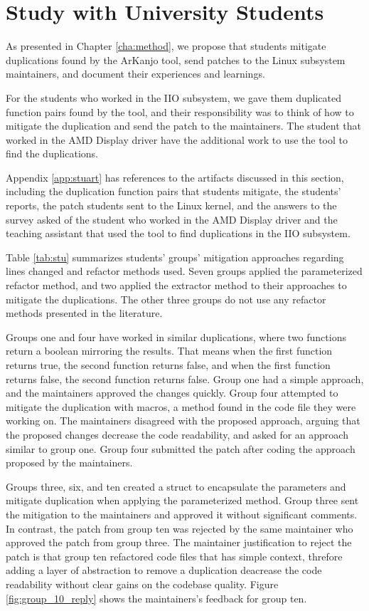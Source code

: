\section{Study with University Students}

As presented in Chapter \ref{cha:method}, we propose that students mitigate duplications 
found by the ArKanjo tool, send patches to the Linux subsystem maintainers, and document 
their experiences and learnings.

For the students who worked in the IIO subsystem, we gave them duplicated function pairs 
found by the tool, and their responsibility was to think of how to mitigate the duplication 
and send the patch to the maintainers. The student that worked in the AMD Display driver 
have the additional work to use the tool to find the duplications.

Appendix \ref{app:stuart} has references to the artifacts discussed in this section, 
including the duplication function pairs that students mitigate, the students’ reports, 
the patch students sent to the Linux kernel, and the answers to the survey asked 
of the student who worked in the AMD Display driver and the teaching assistant that used 
the tool to find duplications in the IIO subsystem.



Table \ref{tab:stu} summarizes students' groups' mitigation approaches regarding lines 
changed and refactor methods used. Seven groups applied the parameterized refactor method, 
and two applied the extractor method to their approaches to mitigate the duplications. 
The other three groups do not use any refactor methods presented in the literature. 

Groups one and four have worked in similar duplications, where two functions return a 
boolean mirroring the results. That means when the first function returns true, the second 
function returns false, and when the first function returns false, the second function 
returns false. Group one had a simple approach, and the maintainers approved the changes quickly. 
Group four attempted to mitigate the duplication with macros, a method found in the code file 
they were working on. The maintainers disagreed with the proposed approach, arguing that the 
proposed changes decrease the code readability, and asked for an approach similar to group one. 
Group four submitted the patch after coding the approach proposed by the maintainers.

Groups three, six, and ten created a struct to encapsulate the parameters and mitigate duplication 
when applying the parameterized method. Group three sent the mitigation to the maintainers and 
approved it without significant comments. In contrast, the patch from group ten was rejected by 
the same maintainer who approved the patch from group three. The maintainer justification to reject 
the patch is that group ten refactored code files that has simple context, threfore adding a layer 
of abstraction to remove a duplication deacrease the code readability without clear gains on 
the codebase quality. Figure \ref{fig:group_10_reply} shows the maintainers's feedback for group ten.



